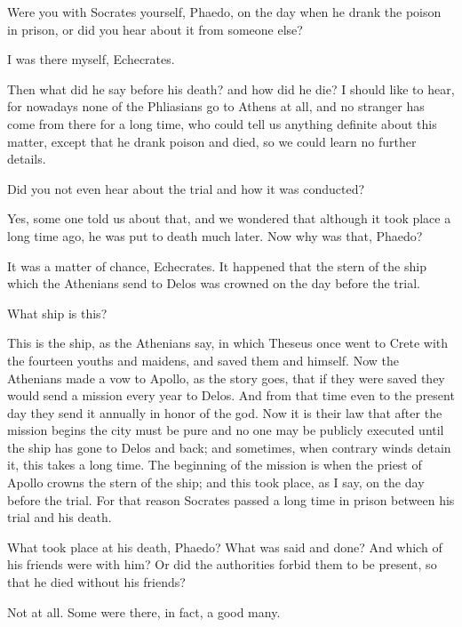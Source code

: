 \documentclass[letterpaper,12pt]{article}
\newcommand{\stephpag}[1]{\marginnote{\small\itshape\fontfamily{ppl}\selectfont #1}}
\begin{document}
\begin{drama}
\setlength{\parindent}{1.5em}
\echecratesspeaks
\stephpag{57 a} Were you with Socrates yourself, Phaedo, on the day when he drank the poison in prison, or did you hear about it from someone else?
 
\phaedospeaks
I was there myself, Echecrates.
 
\echecratesspeaks
Then what did he say before his death? and how did he die? I should like to hear, for nowadays none of the Phliasians go to Athens at all, and no stranger has come from there for a long time, \stephpag{b} who could tell us anything definite about this matter, except that he drank poison and died, so we could learn no further details.
 
\phaedospeaks
Did you not even hear about the trial and how it was conducted?
 
\echecratesspeaks
Yes, some one told us about that, and we wondered that although it took place a long time ago, he was put to death much later. Now why was that, Phaedo? \stephpag{58 a}
 
\phaedospeaks
It was a matter of chance, Echecrates. It happened that the stern of the ship which the Athenians send to Delos was crowned on the day before the trial.
 
\echecratesspeaks
What ship is this?
 
\phaedospeaks
This is the ship, as the Athenians say, in which Theseus once went to Crete with the fourteen \stephpag{b} youths and maidens, and saved them and himself. Now the Athenians made a vow to Apollo, as the story goes, that if they were saved they would send a mission every year to Delos. And from that time even to the present day they send it annually in honor of the god. Now it is their law that after the mission begins the city must be pure and no one may be publicly executed until the ship has gone to Delos and back; and sometimes, when contrary winds \stephpag{c} detain it, this takes a long time. The beginning of the mission is when the priest of Apollo crowns the stern of the ship; and this took place, as I say, on the day before the trial. For that reason Socrates passed a long time in prison between his trial and his death.
 
\echecratesspeaks
What took place at his death, Phaedo? What was said and done? And which of his friends were with him? Or did the authorities forbid them to be present, so that he died without his friends? \stephpag{d}
 
\phaedospeaks
Not at all. Some were there, in fact, a good many.
 

\end{drama}
\end{document}
